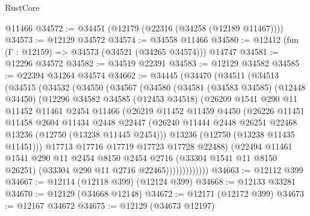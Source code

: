 \begin{lexlean}{RustCore}
\begin{coremodule}
    @11466
@34572 := @34451 (@12179 (@22316 (@34258 (@12189 @11467))))
@34573 := @12129 @34572
@34574 := @34558 @11466
@34580 := @12412 (fun (Γ : @12159) => @34573 (@34521 (@34265 @34574))) @14747
@34581 := @12296 @34572
@34582 := @34519 @22391
@34583 := @12129 @34582
@34585 := @22394 @34264 @34574
@34662 := @34445
    (@34470
      (@34511
        (@34513
          (@34515
            (@34532
              (@34550
                (@34567
                  (@34580
                    (@34581
                      (@34583 @34585)
                      (@12448 @34450)
                      (@12296
                        @34582
                        @34585
                        (@12453 @34518)
                        (@26209
                          @1541
                          @290
                          @11
                          @11452
                          @11461
                          @2454
                          @11466
                          (@26219
                            @11452
                            @11459
                            @4450
                            (@26226
                              @11451
                              @11458
                              @2604
                              @11434
                              @2448
                              @22447
                              (@26240
                                @11444
                                @2448
                                @26251
                                @22468
                                @13236
                                (@12750 (@13238 @11445 @2454)))
                              @13236
                              (@12750 (@13238 @11435 @11451)))
                            @17713
                            @17716
                            @17719
                            @17723
                            @17728
                            @22488)
                          (@22494
                            @11461
                            @1541
                            @290
                            @11
                            @2454
                            @8150
                            @2454
                            @2716
                            (@33304 @1541 @11 @8150 @26251)
                            (@33304 @290 @11 @2716 @22465)))))))))))))
@34663 := @12112 @399
@34667 := @12114 (@12118 @399) (@12124 @399)
@34668 := @12133 @33281
@34670 := @12129 (@34668 @12148)
@34672 := @12171 (@12172 @399)
@34673 := @12167 @34672
@34675 := @12129 (@34673 @12197)

\end{coremodule}
\end{lexlean}
